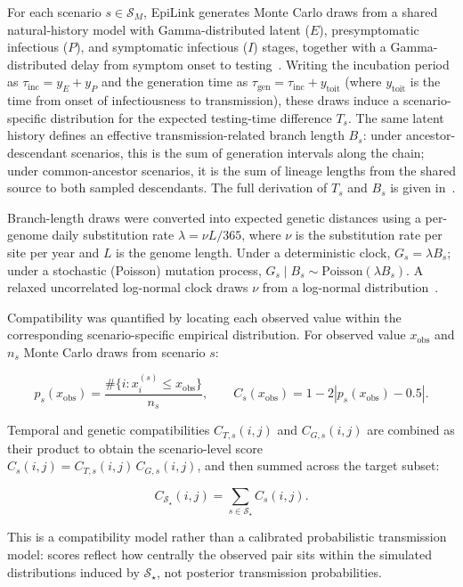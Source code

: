 \documentclass[10pt,letterpaper]{article}
\begin{document}
For each scenario $s\in\mathcal{S}_M$, EpiLink generates Monte Carlo draws from a shared natural-history model with Gamma-distributed latent ($E$), presymptomatic infectious ($P$), and symptomatic infectious ($I$) stages, together with a Gamma-distributed delay from symptom onset to testing~\cite{Hart2021, McAloon2020,
Hart2022}. Writing the incubation period as $\tau_{\mathrm{inc}}=y_E+y_P$ and the generation time as $\tau_{\mathrm{gen}}=\tau_{\mathrm{inc}}+y_{\mathrm{toit}}$ (where $y_{\mathrm{toit}}$ is the time from onset of infectiousness to transmission), these draws induce a scenario-specific distribution for the expected testing-time difference $T_s$. The same latent history defines an effective transmission-related branch length $B_s$: under ancestor-descendant scenarios, this is the sum of generation intervals along the chain; under common-ancestor scenarios, it is the sum of lineage lengths from the shared source to both sampled descendants. The full derivation of $T_s$ and $B_s$ is given in~.

Branch-length draws were converted into expected genetic distances using a per-genome daily substitution rate $\lambda = \nu L/365$, where $\nu$ is the substitution rate per site per year and $L$ is the genome length. Under a deterministic clock, $G_s = \lambda B_s$; under a stochastic (Poisson) mutation process, $G_s \mid B_s \sim \mathrm{Poisson}(\lambda B_s)$. A relaxed uncorrelated log-normal clock draws $\nu$ from a log-normal distribution~\cite{Drummond2006}.

Compatibility was quantified by locating each observed value within the corresponding scenario-specific empirical distribution. For observed value $x_{\mathrm{obs}}$ and $n_s$ Monte Carlo draws from scenario $s$:

\[
p_s(x_{\mathrm{obs}}) = \frac{\#\{i : x_i^{(s)} \le x_{\mathrm{obs}}\}}{n_s},
\qquad
C_s(x_{\mathrm{obs}}) = 1 - 2\left|p_s(x_{\mathrm{obs}}) - 0.5\right|.
\]

Temporal and genetic compatibilities $C_{T,s}(i,j)$ and $C_{G,s}(i,j)$ are combined as their product to obtain the scenario-level score $C_s(i,j) = C_{T,s}(i,j)\, C_{G,s}(i,j)$, and then summed across the target subset:

\[
C_{\mathcal{S}_\star}(i,j) = \sum_{s \in \mathcal{S}_\star} C_s(i,j).
\]

This is a compatibility model rather than a calibrated probabilistic transmission model: scores reflect how centrally the observed pair sits within the simulated distributions induced by $\mathcal{S}_\star$, not posterior transmission
probabilities.
\end{document}
